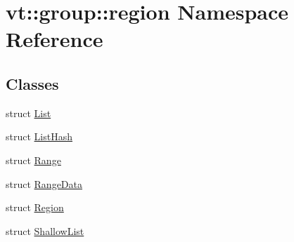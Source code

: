 \hypertarget{namespacevt_1_1group_1_1region}{}\section{vt\+:\+:group\+:\+:region Namespace Reference}
\label{namespacevt_1_1group_1_1region}
\subsection*{Classes}
\begin{DoxyCompactItemize}
\item 
struct \hyperlink{structvt_1_1group_1_1region_1_1_list}{List}
\item 
struct \hyperlink{structvt_1_1group_1_1region_1_1_list_hash}{List\+Hash}
\item 
struct \hyperlink{structvt_1_1group_1_1region_1_1_range}{Range}
\item 
struct \hyperlink{structvt_1_1group_1_1region_1_1_range_data}{Range\+Data}
\item 
struct \hyperlink{structvt_1_1group_1_1region_1_1_region}{Region}
\item 
struct \hyperlink{structvt_1_1group_1_1region_1_1_shallow_list}{Shallow\+List}
\end{DoxyCompactItemize}

